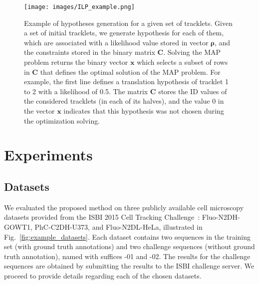 \documentclass{article}
\begin{document}
\begin{figure}[]
    \centering
    \texttt{[image: images/ILP\_example.png]}
    \caption[Example of hypotheses generation for a given set of tracklets.]{Example of hypotheses generation for a given set of tracklets. Given a set of initial tracklets, we generate hypothesis for each of them, which are associated with a likelihood value stored in vector $\bm{\rho}$, and the constraints stored in the binary matrix $\bm{C}$. Solving the MAP problem returns the binary vector $\bm{x}$ which selects a subset of rows in $\bm{C}$ that defines the optimal solution of the MAP problem. For example, the first line defines a translation hypothesis of tracklet 1 to 2 with a likelihood of 0.5. The matrix $\bm{C}$ stores the ID values of the considered tracklets (in each of its halves), and the value 0 in the vector $\bm{x}$ indicates that this hypothesis was not chosen during the optimization solving.}
    \label{fig:ILP_example}
\end{figure}

\section{Experiments}

\subsection{Datasets}\label{sec:datasets}

We evaluated the proposed method on three publicly available cell microscopy datasets provided from the ISBI 2015 Cell Tracking Challenge~\cite{isbi}: Fluo-N2DH-GOWT1, PhC-C2DH-U373, and Fluo-N2DL-HeLa, illustrated in Fig.~\ref{fig:example_datasets}. Each dataset contains two sequences in the training set (with ground truth annotations) and two challenge sequences (without ground truth annotation), named with suffices -01 and -02. The results for the challenge sequences are obtained by submitting the results to the ISBI challenge server. We proceed to provide details regarding each of the chosen datasets.

\begin{figure*}[]
\centering
{}~
~
\caption{Example of cell images for each of the datasets used for evaluation.}
\label{fig:example_datasets}
\end{figure*}
\end{document}
